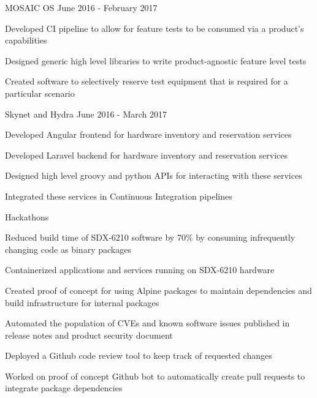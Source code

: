 \begin{cventries}
  \cventry
    {} {MOSAIC OS} {} {June 2016 - February 2017} {
      \begin{cvitems}
        \item {Developed CI pipeline to allow for feature tests to be consumed via a product's capabilities}
        \item {Designed generic high level libraries to write product-agnostic feature level tests}
        \item {Created software to selectively reserve test equipment that is required for a particular scenario}
      \end{cvitems}
    }

  \cventry
    {} {Skynet and Hydra} {} {June 2016 - March 2017} {
      \begin{cvitems} %
        \item {Developed Angular frontend for hardware inventory and reservation services}
        \item {Developed Laravel backend for hardware inventory and reservation services}
        \item {Designed high level groovy and python APIs for interacting with these services}
        \item {Integrated these services in Continuous Integration pipelines}
      \end{cvitems}
    }

  \cventry
    {} {Hackathons} {} {} {
      \begin{cvitems}
        \item {Reduced build time of SDX-6210 software by 70\% by consuming infrequently changing code as binary packages}
        \item {Containerized applications and services running on SDX-6210 hardware}
        \item {Created proof of concept for using Alpine packages to maintain dependencies and build infrastructure for internal packages}
        \item {Automated the population of CVEs and known software issues published in release notes and product security document}
        \item {Deployed a Github code review tool to keep track of requested changes}
        \item {Worked on proof of concept Github bot to automatically create pull requests to integrate package dependencies}
      \end{cvitems}
    }

\end{cventries}
